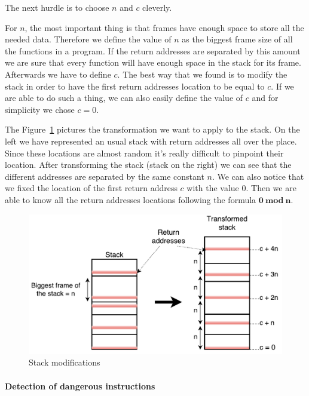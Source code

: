 \documentclass[11pt]{sdm}
\begin{document}
The next hurdle is to choose $n$ and $c$ cleverly. 

For $n$, the most important thing is that frames have enough space to store all the needed data. Therefore we define the value of $n$ as the biggest frame size of all the functions in a program. If the return addresses are separated by this amount we are sure that every function will have enough space in the stack for its frame. 
Afterwards we have to define $c$. The best way that we found is to modify the stack in order to have the first return addresses location to be equal to $c$. If we are able to do such a thing, we can also easily define the value of $c$ and for simplicity we chose $c=0$.

The Figure~\ref{idea_stack} pictures the transformation we want to apply to the stack. On the left we have represented an usual stack with return addresses all over the place. Since these locations are almost random it's really difficult to pinpoint their location. After transforming the stack (stack on the right) we can see that the different addresses are separated by the same constant $n$. We can also notice that we fixed the location of the first return address $c$ with the value 0.
Then we are able to know all the return addresses locations following the formula $\mathbf{0~mod~n}$.

\begin{figure}
\centering
\includegraphics[scale=0.6]{images/idea_stack.pdf}
\caption{Stack modifications}
\label{idea_stack}
\end{figure}

\paragraph{Detection of dangerous instructions}
\label{par:Detection of dangerous instructions}
\end{document}
